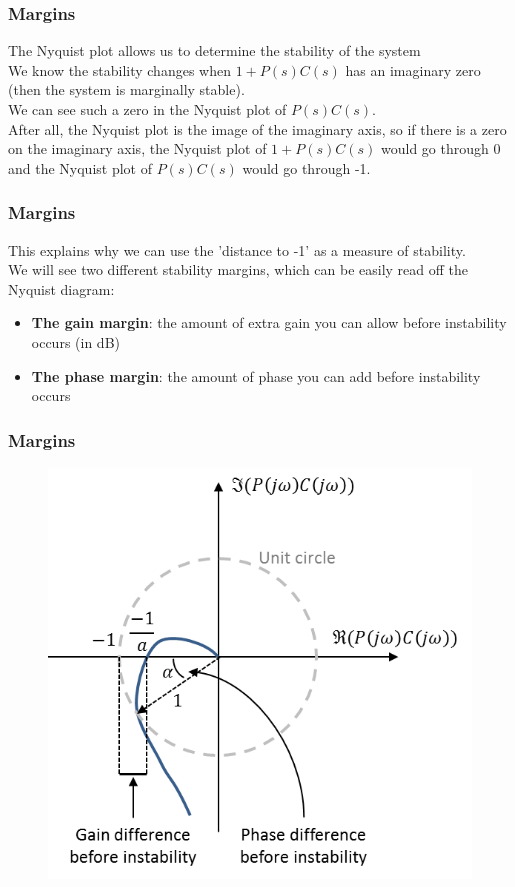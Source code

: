 \begin{frame}
	\frametitle{Margins}
	\vspace{-6ex}
	The Nyquist plot allows us to determine the stability of the system\\
	We know the stability changes when $1+P(s)C(s)$ has an imaginary zero (then the system is marginally stable).\\
	\medskip
	We can see such a zero in the Nyquist plot of $P(s)C(s)$.\\ After all, the Nyquist plot is the image of the imaginary axis, so if there is a zero on the imaginary axis, the Nyquist plot of $1+P(s)C(s)$ would go through 0 and the Nyquist plot of $P(s)C(s)$ would go through -1.
\end{frame}

\begin{frame}
	\frametitle{Margins}
	\vspace{-6ex}
	This explains why we can use the 'distance to -1' as a measure of stability.\\
	\medskip
	We will see two different stability margins, which can be easily read off the Nyquist diagram:
	\begin{itemize}
		\item \textbf{The gain margin}: the amount of extra gain you can allow before instability occurs (in dB)
		\item \textbf{The phase margin}: the amount of phase you can add before instability occurs
	\end{itemize}
\end{frame}

\begin{frame}
	\frametitle{Margins}
	\begin{figure}
		\includegraphics[width=0.6\linewidth]{margins}
	\end{figure}
\end{frame}

